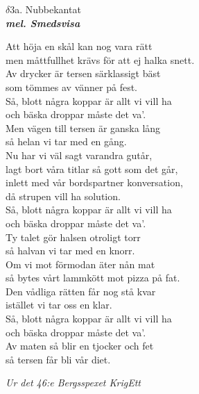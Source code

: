 \documentclass[a6paper,10pt]{article}
\newcommand{\mel}[1]{\small\textbf{\textit{mel. #1 \\}}}
\begin{document}
\setlength{\oddsidemargin}{-0.47in}
\noindent
\begin{center}
\Large $\delta3$a. Nubbekantat \\ 
\mel{Smedsvisa}
\end{center}
Att höja en skål kan nog vara rätt \\
men måttfullhet krävs för att ej halka snett. \\
Av drycker är tersen särklassigt bäst \\
som tömmes av vänner på fest. \\
Så, blott några koppar är allt vi vill ha \\
och bäska droppar måste det va'. \\
Men vägen till tersen är ganska lång \\
så helan vi tar med en gång. 
\vspace{5pt} \\
Nu har vi väl sagt varandra gutår, \\
lagt bort våra titlar så gott som det går, \\
inlett med vår bordspartner konversation, \\
då strupen vill ha solution. \\
Så, blott några koppar är allt vi vill ha \\
och bäska droppar måste det va'. \\
Ty talet gör halsen otroligt torr \\
så halvan vi tar med en knorr. 
\vspace{5pt} \\
Om vi mot förmodan äter nån mat \\
så bytes vårt lammkött mot pizza på fat. \\
Den vådliga rätten får nog stå kvar \\
istället vi tar oss en klar. \\
Så, blott några koppar är allt vi vill ha \\
och bäska droppar måste det va'. \\
Av maten så blir en tjocker och fet \\
så tersen får bli vår diet. 
\begin{flushright}
\textit{Ur det 46:e Bergsspexet KrigEtt}
\end{flushright}
\end{document}
